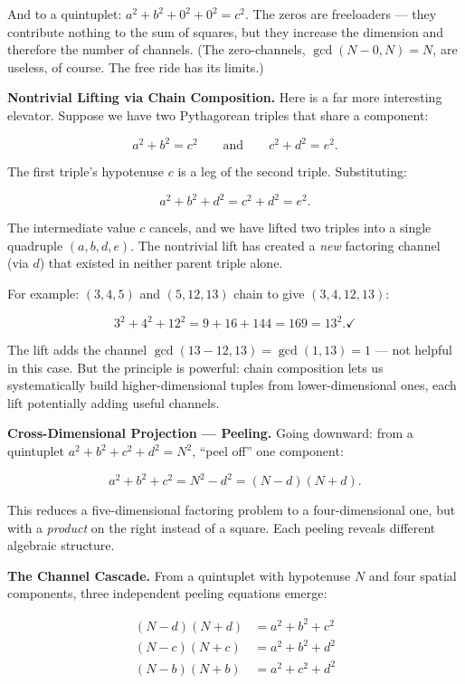 And to a quintuplet: \(a^2 + b^2 + 0^2 + 0^2 = c^2\). The zeros are freeloaders --- they contribute nothing to the sum of squares, but they increase the dimension and therefore the number of channels. (The zero-channels, \(\gcd(N - 0, N) = N\), are useless, of course. The free ride has its limits.)

\textbf{Nontrivial Lifting via Chain Composition.} Here is a far more interesting elevator. Suppose we have two Pythagorean triples that share a component:

\[a^2 + b^2 = c^2 \qquad \text{and} \qquad c^2 + d^2 = e^2.\]

The first triple's hypotenuse \(c\) is a leg of the second triple. Substituting:

\[a^2 + b^2 + d^2 = c^2 + d^2 = e^2.\]

The intermediate value \(c\) cancels, and we have lifted two triples into a single quadruple \((a, b, d, e)\). The nontrivial lift has created a \emph{new} factoring channel (via \(d\)) that existed in neither parent triple alone.

For example: \((3, 4, 5)\) and \((5, 12, 13)\) chain to give \((3, 4, 12, 13)\):

\[3^2 + 4^2 + 12^2 = 9 + 16 + 144 = 169 = 13^2. \checkmark\]

The lift adds the channel \(\gcd(13 - 12, 13) = \gcd(1, 13) = 1\) --- not helpful in this case. But the principle is powerful: chain composition lets us systematically build higher-dimensional tuples from lower-dimensional ones, each lift potentially adding useful channels.

\textbf{Cross-Dimensional Projection --- Peeling.} Going downward: from a quintuplet \(a^2 + b^2 + c^2 + d^2 = N^2\), ``peel off'' one component:

\[a^2 + b^2 + c^2 = N^2 - d^2 = (N - d)(N + d).\]

This reduces a five-dimensional factoring problem to a four-dimensional one, but with a \emph{product} on the right instead of a square. Each peeling reveals different algebraic structure.

\textbf{The Channel Cascade.} From a quintuplet with hypotenuse \(N\) and four spatial components, three independent peeling equations emerge:

\[\begin{aligned}
(N - d)(N + d) &= a^2 + b^2 + c^2 \\
(N - c)(N + c) &= a^2 + b^2 + d^2 \\
(N - b)(N + b) &= a^2 + c^2 + d^2
\end{aligned}\]

